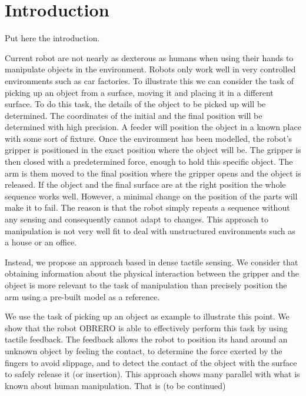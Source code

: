 \section{Introduction}
Put here the introduction.

%
Current robot are not nearly as dexterous as humans when using
their hands to manipulate objects in the environment. Robots only
work well in very controlled environments such as car factories.
To illustrate this we can consider the task of picking up an
object from a surface, moving it and placing it in a different
surface. To do this task, the details of the object to be picked
up will be determined. The coordinates of the initial and the
final position will be determined with high precision. A feeder
will position the object in a known place with some sort of
fixture. Once the environment has been modelled, the robot's
gripper is positioned in the exact position where the object will
be. The gripper is then closed with a predetermined force, enough
to hold this specific object. The arm is them moved to the final
position where the gripper opens and the object is released. If
the object and the final surface are at the right position the
whole sequence works well.
%
However, a minimal change on the position of the parts will make
it to fail. The reason is that the robot simply repeats a sequence
without any sensing and consequently cannot adapt to changes.
%
This approach to manipulation is not very well fit to deal with
unstructured environments such as a house or an office.

Instead, we propose an approach based in dense tactile sensing. We
consider that obtaining information about the physical interaction
between the gripper and the object is more relevant to the task of
manipulation than precisely position the arm using a pre-built
model as a reference.

We use the task of picking up an object as example to illustrate
this point. We show that the robot OBRERO is able to effectively
perform this task by using tactile feedback. The feedback allows
the robot to position its hand around an unknown object by feeling
the contact, to determine the force exerted by the fingers to
avoid slippage, and to detect the contact of the object with the
surface to safely release it (or insertion).
%
This approach shows many parallel with what is known about human
manipulation. That is (to be continued)
